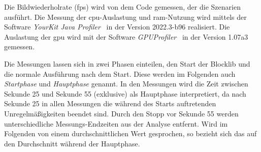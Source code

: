 Die Bildwiederholrate (\ac{fps}) wird von dem Code gemessen, der die Szenarien ausführt. Die Messung der \ac{cpu}-Auslastung und \ac{ram}-Nutzung wird mittels der Software \emph{YourKit Java Profiler}~\cite{YourKitGmbH} in der Version 2022.3-b96 realisiert. Die Auslastung der \ac{gpu} wird mit der Software \emph{GPUProfiler}~\cite{Main2021} in der Version 1.07a3 gemessen. 

Die Messungen lassen sich in zwei Phasen einteilen, den Start der Blocklib und die normale Ausführung nach dem Start. Diese werden im Folgenden auch \emph{Startphase} und \emph{Hauptphase} genannt. In den Messungen wird die Zeit zwischen Sekunde 25 und Sekunde 55 (exklusive) als Hauptphase interpretiert, da nach Sekunde 25 in allen Messungen die während des Starts auftretenden Unregelmäßigkeiten beendet sind. Durch den Stopp vor Sekunde 55 werden unterschiedliche Messungs-Endzeiten aus der Analyse entfernt. Wird im Folgenden von einem durchschnittlichen Wert gesprochen, so bezieht sich das auf den Durchschnitt während der Hauptphase.